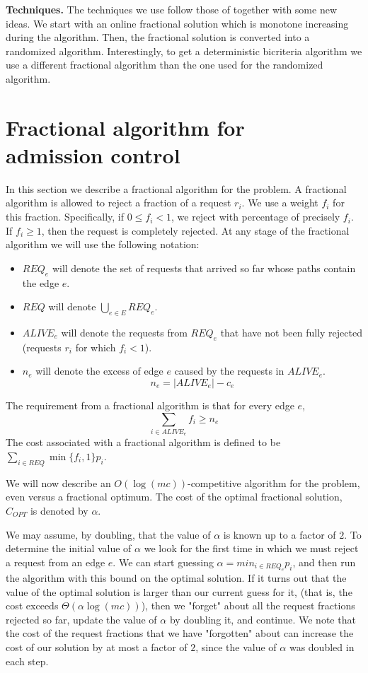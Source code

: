 \documentclass{sig-alternate}
\begin{document}
\textbf{Techniques.} The techniques we use follow those of
\cite{AAABN03,AAABN04} together with some new ideas. We start with
an online fractional solution which is monotone increasing during
the algorithm. Then, the fractional solution is converted into a
randomized algorithm. Interestingly, to get a deterministic
bicriteria algorithm we use a different fractional algorithm than
the one used for the randomized algorithm.



\section{Fractional algorithm for \\ admission control}\label{sec:frac}
In this section we describe a fractional algorithm for the
problem. A fractional algorithm is allowed to reject a fraction of
a request $r_i$. We use a weight $f_i$ for this fraction.
Specifically, if $0 \leq f_i < 1$, we reject with percentage of
precisely $f_i$. If $f_i \geq 1$, then the request is completely
rejected. At any stage of the fractional algorithm we will use the
following notation:
\begin{itemize}
    \item $REQ_e$ will denote the set of requests that arrived
    so far whose paths contain the edge $e$.
    \item $REQ$ will denote $\bigcup_{e \in E} REQ_e$.
    \item $ALIVE_e$ will denote the requests from $REQ_e$
    that have not been fully rejected (requests $r_i$ for which $f_i < 1$).
    \item $n_e$ will denote the excess of edge $e$ caused by the
    requests in $ALIVE_e$.
    $$n_e = |ALIVE_e| - c_e$$
\end{itemize}
The requirement from a fractional algorithm is that for every edge
$e$,
$$ \sum_{i \in ALIVE_e} f_i \geq n_e $$
The cost associated with a fractional algorithm is defined to be
$\sum_{i \in REQ} \min \{f_i,1\} p_i$.

We will now describe an $O(\log (mc))$-competitive algorithm for
the problem, even versus a fractional optimum. The cost of the
optimal fractional solution, $C_{OPT}$ is denoted by $\alpha$.

We may assume, by doubling, that the value of $\alpha$ is known up
to a factor of $2$. To determine the initial value of $\alpha$ we
look for the first time in which we must reject a request from an
edge $e$. We can start guessing $\alpha = min_{i \in REQ_e} p_i$,
and then run the algorithm with this bound on the optimal
solution. If it turns out that the value of the optimal solution
is larger than our current guess for it, (that is, the cost
exceeds $\Theta(\alpha \log (mc))$), then we "forget" about all
the request fractions rejected so far, update the value of
$\alpha$ by doubling it, and continue. We note that the cost of
the request fractions that we have "forgotten" about can increase
the cost of our solution by at most a factor of $2$, since the
value of $\alpha$ was doubled in each step.
\end{document}
